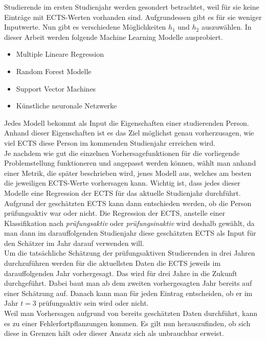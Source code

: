Studierende im ersten Studienjahr werden gesondert betrachtet, weil f\"ur sie keine Eintr\"age mit ECTS-Werten vorhanden sind.
Aufgrundessen gibt es f\"ur sie weniger Inputwerte.
Nun gibt es verschiedene M\"oglichkeiten $h_1$ und $h_2$ auszuwählen. In dieser Arbeit
werden folgende Machine Learning Modelle ausprobiert.

\begin{itemize}
    \item Multiple Lineare Regression
    \item Random Forest Modelle
    \item Support Vector Machines
    \item K\"unstliche neuronale Netzwerke
\end{itemize}

Jedes Modell bekommt als Input die Eigenschaften einer studierenden Person. Anhand dieser Eigenschaften ist es das Ziel m\"oglichst genau 
vorherzusagen, wie viel ECTS diese Person im kommenden Studienjahr erreichen wird. \\

Je nachdem wie gut die einzelnen Vorhersagefunktionen für die vorliegende Problemstellung funktioneren
und angepasst werden können, w\"ahlt man anhand einer Metrik, die sp\"ater beschrieben wird, jenes Modell aus, welches 
am besten die jeweiligen ECTS-Werte vorhersagen kann.
Wichtig ist, dass jedes dieser Modelle eine Regression der ECTS f\"ur das aktuelle Studienjahr
durchf\"uhrt. Aufgrund der gesch\"atzten ECTS kann dann entschieden werden, ob die Person
pr\"ufungsaktiv war oder nicht. Die Regression der ECTS, anstelle einer Klassifikation nach
\textit{pr\"ufungsaktiv} oder \textit{pr\"ufungsinaktiv} wird deshalb gew\"ahlt, da man dann im darauffolgenden Studienjahr diese
gesch\"atzten ECTS als Input f\"ur den Sch\"atzer im Jahr darauf verwenden will.\\


Um die tats\"achliche Sch\"atzung der pr\"ufungsaktiven Studierenden in drei Jahren durchzuf\"uhren werden f\"ur die 
aktuellsten Daten die ECTS jeweils im darauffolgenden Jahr vorhergesagt. Das wird f\"ur drei Jahre in die Zukunft durchgef\"uhrt. 
Dabei baut man ab dem zweiten vorhergesagten Jahr 
bereits auf einer Sch\"atzung auf. Danach kann man f\"ur jeden Eintrag entscheiden, ob er im Jahr $t = 3$ pr\"ufungsaktiv sein wird oder nicht. \\

Weil man Vorhersagen aufgrund von bereits gesch\"atzten Daten durchf\"uhrt, kann es zu einer Fehlerfortpflanzungen kommen. 
Es gilt nun herauszufinden, ob sich diese in Grenzen h\"alt oder dieser Ansatz sich als unbrauchbar erweist. \\





